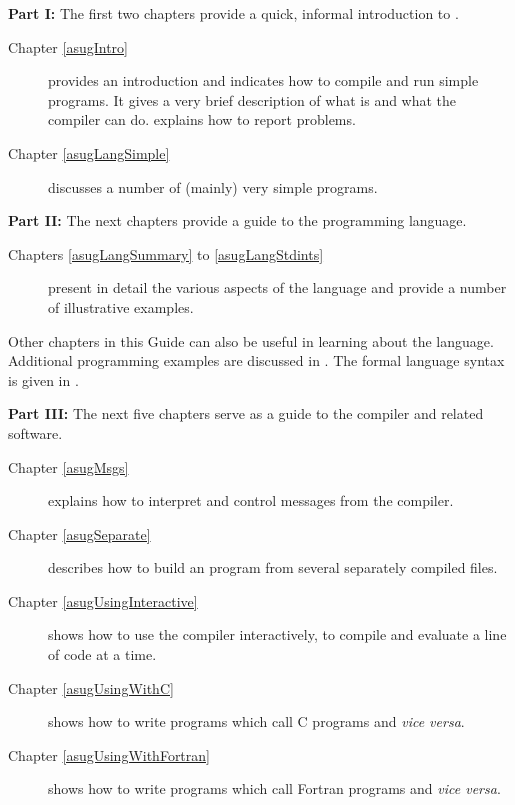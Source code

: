 {\bf Part I:}
The first two chapters provide a quick, informal introduction to
\asharp{}.
\begin{description}
\item[Chapter \ref{asugIntro}]
  provides an introduction and indicates how to compile and run
  simple programs.
  It gives a very brief description of what \asharp{} is and what the
  compiler can do.   explains how to report
  problems.
\item[Chapter \ref{asugLangSimple}]
  discusses a number of (mainly) very simple programs.
\end{description}
{\bf Part II:}
The next chapters provide a guide to the \asharp{} programming language.
\begin{description}
\item[Chapters \ref{asugLangSummary} to \ref{asugLangStdints}]
present in detail the various aspects
of the language and provide a number of illustrative examples.
\end{description}

Other chapters in this Guide can also be useful in learning about the
language.
Additional programming examples are discussed
in .  The formal language syntax is given in
.

{\bf Part III:}
The next five chapters serve as a guide to the \asharp{} compiler and
related software.
\begin{description}
\item[Chapter \ref{asugMsgs}]
  explains how to interpret and control messages from the compiler.
\item[Chapter \ref{asugSeparate}] 
  describes how to build an \asharp{} program from several separately
  compiled files.
\item[Chapter \ref{asugUsingInteractive}]
  shows how to use the \asharp{} compiler interactively, to compile
  and evaluate a line of code at a time.  
\item[Chapter \ref{asugUsingWithC}]
  shows how to write \asharp{} programs which call C programs and
  {\it vice versa\/}.
\item[Chapter \ref{asugUsingWithFortran}]
  shows how to write \asharp{} programs which call Fortran programs and
  {\it vice versa\/}.
\end{description}

